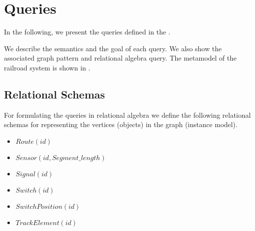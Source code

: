 

\section{\tb{} Queries}


In the following, we present the queries defined in the \tb{}. %

We describe the semantics and the goal of each query. We also show the associated graph pattern and relational algebra query. The metamodel of the railroad system is shown in .

\subsection{Relational Schemas}

For formulating the queries in relational algebra we define the following relational schemas for representing the vertices (objects) in the graph (instance model).

\begin{itemize}
  \item $ \mathit{Route}\left(\mathit{id}\right) $
  \item $ \mathit{Sensor}\left(\mathit{id}, \mathit{Segment\_length}\right) $
  \item $ \mathit{Signal}\left(\mathit{id}\right) $
  \item $ \mathit{Switch}\left(\mathit{id}\right) $
  \item $ \mathit{SwitchPosition}\left(\mathit{id}\right) $
  \item $ \mathit{TrackElement}\left(\mathit{id}\right) $
\end{itemize}

